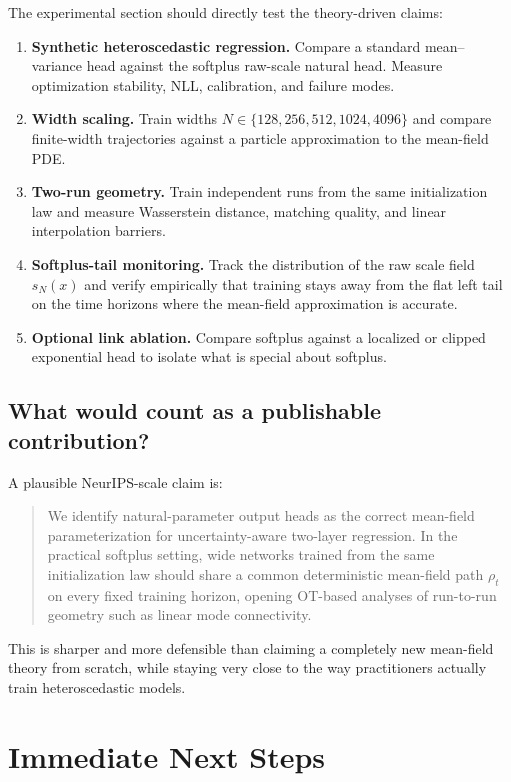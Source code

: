 \documentclass[11pt]{article}
\theoremstyle{definition}
\begin{document}
The experimental section should directly test the theory-driven claims:
\begin{enumerate}[label=(E\arabic*)]
  \item \textbf{Synthetic heteroscedastic regression.} Compare a standard
  mean--variance head against the softplus raw-scale natural head. Measure
  optimization stability, NLL, calibration, and failure modes.
  \item \textbf{Width scaling.} Train widths
  $N\in\{128,256,512,1024,4096\}$ and compare finite-width trajectories against a
  particle approximation to the mean-field PDE.
  \item \textbf{Two-run geometry.} Train independent runs from the same
  initialization law and measure Wasserstein distance, matching quality, and
  linear interpolation barriers.
  \item \textbf{Softplus-tail monitoring.} Track the distribution of the raw
  scale field $s_N(x)$ and verify empirically that training stays away from the
  flat left tail on the time horizons where the mean-field approximation is
  accurate.
  \item \textbf{Optional link ablation.} Compare softplus against a localized or
  clipped exponential head to isolate what is special about softplus.
\end{enumerate}

\subsection{What would count as a publishable contribution?}

A plausible NeurIPS-scale claim is:
\begin{quote}
We identify natural-parameter output heads as the correct mean-field
parameterization for uncertainty-aware two-layer regression. In the practical
softplus setting, wide networks trained from the same initialization law should
share a common deterministic mean-field path $\rho_t$ on every fixed training
horizon, opening OT-based analyses of run-to-run geometry such as linear mode
connectivity.
\end{quote}

This is sharper and more defensible than claiming a completely new mean-field
theory from scratch, while staying very close to the way practitioners actually
train heteroscedastic models.

\section{Immediate Next Steps}
\end{document}
